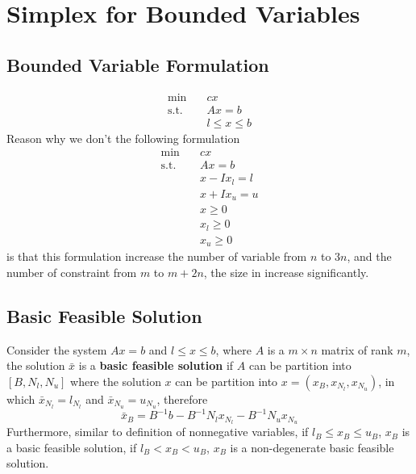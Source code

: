 		\section{Simplex for Bounded Variables}
			\subsection{Bounded Variable Formulation}
				\begin{align}
					\min \quad & cx \\
					\text{s.t.} \quad & Ax=b \\
									  & l \le x\le b 
				\end{align}
				Reason why we don't the following formulation
				\begin{align}
					\min \quad & cx \\
					\text{s.t.} \quad & Ax=b \\
					                  & x - Ix_l = l \\
					                  & x + Ix_u = u \\
					                  & x \ge 0\\
					                  & x_l \ge 0\\
					                  & x_u \ge 0 
				\end{align}
				is that this formulation increase the number of variable from $n$ to $3n$, and the number of constraint from $m$ to $m+2n$, the size in increase significantly.

			\subsection{Basic Feasible Solution}
				Consider the system $Ax=b$ and $l\le x\le b$, where $A$ is a $m\times n$ matrix of rank $m$, the solution $\bar{x}$ is a \textbf{basic feasible solution} if $A$ can be partition into $[B, N_l, N_u]$ where the solution $x$ can be partition into $x=(x_B, x_{N_l}, x_{N_u})$, in which $\bar{x}_{N_l} = l_{N_l}$ and $\bar{x}_{N_u} = u_{N_u}$, therefore
				\begin{equation}
					\bar{x}_B = B^{-1}b - B^{-1}N_lx_{N_l} - B^{-1}N_ux_{N_u} 
				\end{equation}
				Furthermore, similar to definition of nonnegative variables, if $l_B \le x_B \le u_B$, $x_B$ is a basic feasible solution, if $l_B < x_B < u_B$, $x_B$ is a non-degenerate basic feasible solution. 


